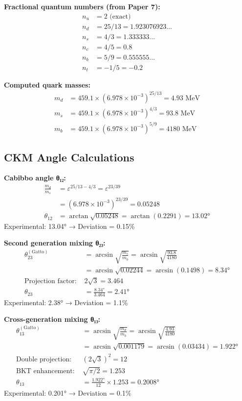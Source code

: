 ﻿\documentclass[prd,twocolumn,showpacs,superscriptaddress,groupedaddress]{revtex4-2}
\begin{document}
\textbf{Fractional quantum numbers (from Paper 7):}
\begin{align}
n_u &= 2 \text{ (exact)} \\
n_d &= 25/13 = 1.923076923... \\
n_s &= 4/3 = 1.333333... \\
n_c &= 4/5 = 0.8 \\
n_b &= 5/9 = 0.555555... \\
n_t &= -1/5 = -0.2
\end{align}

\textbf{Computed quark masses:}
\begin{align}
m_d &= 459.1 \times (6.978 \times 10^{-3})^{25/13} = 4.93 \text{ MeV} \\
m_s &= 459.1 \times (6.978 \times 10^{-3})^{4/3} = 93.8 \text{ MeV} \\
m_b &= 459.1 \times (6.978 \times 10^{-3})^{5/9} = 4180 \text{ MeV}
\end{align}

\subsection{CKM Angle Calculations}

\textbf{Cabibbo angle θ₁₂:}
\begin{align}
\frac{m_d}{m_s} &= \varepsilon^{25/13 - 4/3} = \varepsilon^{23/39} \\
&= (6.978 \times 10^{-3})^{23/39} = 0.05248 \\
\theta_{12} &= \arctan\sqrt{0.05248} = \arctan(0.2291) = 13.02°
\end{align}
Experimental: 13.04° → Deviation = 0.15\%

\textbf{Second generation mixing θ₂₃:}
\begin{align}
\theta_{23}^{(\text{Gatto})} &= \arcsin\sqrt{\frac{m_s}{m_b}} = \arcsin\sqrt{\frac{93.8}{4180}} \\
&= \arcsin\sqrt{0.02244} = \arcsin(0.1498) = 8.34° \\
\text{Projection factor: } &2\sqrt{3} = 3.464 \\
\theta_{23} &= \frac{8.34°}{3.464} = 2.41°
\end{align}
Experimental: 2.38° → Deviation = 1.1\%

\textbf{Cross-generation mixing θ₁₃:}
\begin{align}
\theta_{13}^{(\text{Gatto})} &= \arcsin\sqrt{\frac{m_d}{m_b}} = \arcsin\sqrt{\frac{4.93}{4180}} \\
&= \arcsin\sqrt{0.001179} = \arcsin(0.03434) = 1.922° \\
\text{Double projection: } &(2\sqrt{3})^2 = 12 \\
\text{BKT enhancement: } &\sqrt{\pi/2} = 1.253 \\
\theta_{13} &= \frac{1.922°}{12} \times 1.253 = 0.2008°
\end{align}
Experimental: 0.201° → Deviation = 0.1\%
\end{document}
